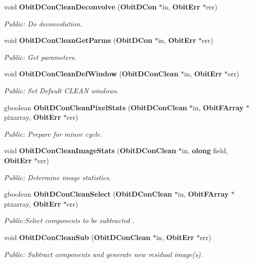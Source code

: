 \begin{CompactItemize}
void {\bf Obit\-DCon\-Clean\-Deconvolve} ({\bf Obit\-DCon} $\ast$in, {\bf Obit\-Err} $\ast$err)
\begin{CompactList}\small\item\em Public: Do deconvolution. \item\end{CompactList}\item 
void {\bf Obit\-DCon\-Clean\-Get\-Parms} ({\bf Obit\-DCon} $\ast$in, {\bf Obit\-Err} $\ast$err)
\begin{CompactList}\small\item\em Public: Get parameters. \item\end{CompactList}\item 
void {\bf Obit\-DCon\-Clean\-Def\-Window} ({\bf Obit\-DCon\-Clean} $\ast$in, {\bf Obit\-Err} $\ast$err)
\begin{CompactList}\small\item\em Public: Set Default CLEAN windows. \item\end{CompactList}\item 
gboolean {\bf Obit\-DCon\-Clean\-Pixel\-Stats} ({\bf Obit\-DCon\-Clean} $\ast$in, {\bf Obit\-FArray} $\ast$pixarray, {\bf Obit\-Err} $\ast$err)
\begin{CompactList}\small\item\em Public: Prepare for minor cycle. \item\end{CompactList}\item 
void {\bf Obit\-DCon\-Clean\-Image\-Stats} ({\bf Obit\-DCon\-Clean} $\ast$in, {\bf olong} field, {\bf Obit\-Err} $\ast$err)
\begin{CompactList}\small\item\em Public: Determine image statistics. \item\end{CompactList}\item 
gboolean {\bf Obit\-DCon\-Clean\-Select} ({\bf Obit\-DCon\-Clean} $\ast$in, {\bf Obit\-FArray} $\ast$pixarray, {\bf Obit\-Err} $\ast$err)
\begin{CompactList}\small\item\em Public:Select components to be subtracted . \item\end{CompactList}\item 
void {\bf Obit\-DCon\-Clean\-Sub} ({\bf Obit\-DCon\-Clean} $\ast$in, {\bf Obit\-Err} $\ast$err)
\begin{CompactList}\small\item\em Public: Subtract components and generate new residual image(s). \item\end{CompactList}\item 

\end{CompactItemize}
